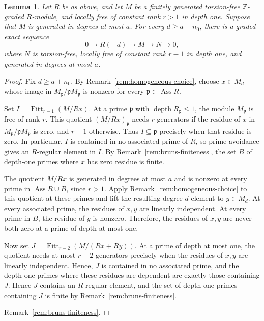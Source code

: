 \documentclass[11pt,letterpaper]{amsart}
\DeclareMathOperator{\dep}{depth}
\theoremstyle{plain}
\newtheorem{lem}[thm]{Lemma}
\theoremstyle{definition}
\theoremstyle{remark}
\begin{document}
\begin{lem}
\label{lem:bourbaki-rank-reduction}
Let $R$ be as above, and let $M$ be a finitely generated torsion-free $\mathbb{Z}$-graded $R$-module, and locally free of constant rank $r>1$ in depth one. Suppose that $M$ is
generated in degrees at most $a$. For every $d\ge a+n_0$, there is
a graded exact sequence
\[
0\longrightarrow R(-d)\longrightarrow M\longrightarrow N
\longrightarrow0,
\]
where $N$ is torsion-free, locally free of constant rank $r-1$
in depth one,
and generated in degrees at most $a$.
\end{lem}
\begin{proof}
Fix $d\ge a+n_0$. By Remark~\ref{rem:homogeneous-choice}, choose
$x\in M_d$ whose image in
$M_{\mathfrak p}/\mathfrak pM_{\mathfrak p}$ is nonzero for every
$\mathfrak p\in\operatorname{Ass}R$.

Set $I=\operatorname{Fitt}_{r-1}(M/Rx)$. At a prime
$\mathfrak p$ with $\dep R_{\mathfrak p}\le1$, the module
$M_{\mathfrak p}$ is free of rank $r$. This quotient $(M/Rx)_{\mathfrak{p}}$ needs
$r$ generators if the residue of $x$ in $M_\mathfrak{p}/\mathfrak{p}M_\mathfrak{p}$ 
is zero, and $r-1$ otherwise.
Thus $I\subseteq\mathfrak p$ precisely when that residue is zero.
In particular, $I$ is contained in no associated prime of $R$,
so prime avoidance gives an $R$-regular element in $I$.
By Remark~\ref{rem:bruns-finiteness}, the set $B$ of depth-one
primes where $x$ has zero residue is finite.

The quotient $M/Rx$ is generated in degrees at most $a$ and is
nonzero at every prime in $\operatorname{Ass}R\cup B$, since
$r>1$. Apply Remark~\ref{rem:homogeneous-choice} to this quotient
at these primes and lift the resulting degree-$d$ element to
$y\in M_d$. At every associated prime, the residues of $x,y$
are linearly independent. At every prime in $B$, the residue
of $y$ is nonzero. Therefore, the residues of $x,y$ are never
both zero at a prime of depth at most one.

Now set $J=\operatorname{Fitt}_{r-2}(M/(Rx+Ry))$. At a prime
of depth at most one, the quotient needs at most $r-2$
generators precisely when the residues of $x,y$ are linearly
independent. Hence, $J$ is contained in no associated prime,
and the depth-one primes where these residues are dependent
are exactly those containing $J$. Hence $J$ contains an $R$-regular element, and the set of depth-one primes containing $J$ is finite by Remark~\ref{rem:bruns-finiteness}.

Remark~\ref{rem:bruns-finiteness}.


\end{proof}
\end{document}
